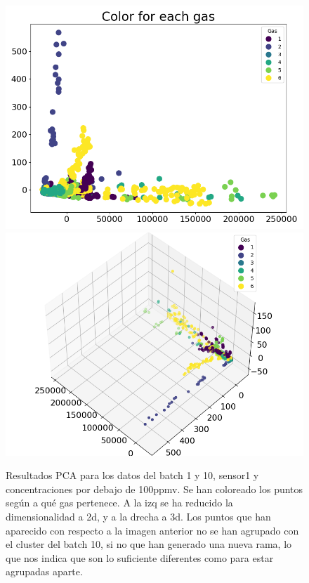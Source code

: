 \begin{figure}[h!]
	\centering
	\includegraphics[width=0.45\linewidth]{"../py_imgs/Step0_3_Color for each gas_Batch1and10_Sensor1_Conc less 100ppmv"}
	\includegraphics[width=0.45\linewidth]{"../py_imgs/Step0_3_Color for each gas_3d_Batch1and10_Sensor1_Conc less 100ppmv"}
	\caption[Resultados PCA modelo batch 1 y 10]{Resultados PCA para los datos del batch 1 y 10, sensor1 y concentraciones por debajo de 100ppmv. Se han coloreado los  puntos según a qué gas pertenece. A la izq se ha reducido la dimensionalidad a 2d, y a la drecha a 3d. Los puntos que han aparecido con respecto a la imagen anterior no se han agrupado con el cluster del batch 10, si no que han generado una nueva rama, lo que nos indica que son lo suficiente diferentes como para estar agrupadas aparte.}
	\label{fig:step03kmeans-1-10-color-for-each-gas}
\end{figure}

